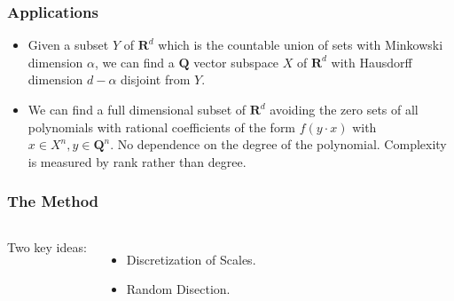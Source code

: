 \documentclass[usenames,dvipsnames]{beamer}
\begin{document}
\begin{frame}
    \frametitle{Applications}

    \begin{itemize}
        \item Given a subset $Y$ of $\mathbf{R}^d$ which is the countable union of sets with Minkowski dimension $\alpha$, we can find a $\mathbf{Q}$ vector subspace $X$ of $\mathbf{R}^d$ with Hausdorff dimension $d - \alpha$ disjoint from $Y$.

        \pause
        \item We can find a full dimensional subset of $\mathbf{R}^d$ avoiding the zero sets of all polynomials with rational coefficients of the form $f(y \cdot x)$ with $x \in X^n, y \in \mathbf{Q}^n$. No dependence on the degree of the polynomial. Complexity is measured by rank rather than degree.

    \end{itemize}
\end{frame}

\begin{frame}
    \frametitle{The Method}

    \begin{columns}


    {\Huge Two key ideas: }
    \pause

     \begin{itemize}
        \item {\Large Discretization of Scales.}
        \pause

        \item {\Large Random Disection.}
     \end{itemize}

     \end{columns}
\end{frame}

\end{document}
